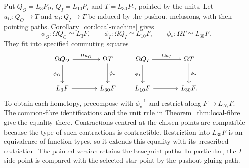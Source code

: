 Put $Q_O=L_3P_O$, $Q_I=L_{10}P_I$ and $T=L_{30}P_*$, pointed by the units. Let $u_O:Q_O\to T$ and $u_I:Q_I\to T$ be induced by the pushout inclusions, with their pointing paths. Corollary~\ref{cor:local-machine} gives
\[
\phi_O:\Omega Q_O\simeq L_3F,\qquad
\phi_I:\Omega Q_I\simeq L_{10}F,\qquad
\phi_*:\Omega T\simeq L_{30}F.
\]
They fit into specified commuting squares
\begin{equation}\label{eq:loop-comparisons}
\begin{tikzcd}[column sep=large,row sep=large]
\Omega Q_O \arrow[r,"\Omega u_O"] \arrow[d,"\phi_O"'] & \Omega T \arrow[d,"\phi_*"] \\
L_3F \arrow[r] & L_{30}F
\end{tikzcd}
\qquad
\begin{tikzcd}[column sep=large,row sep=large]
\Omega Q_I \arrow[r,"\Omega u_I"] \arrow[d,"\phi_I"'] & \Omega T \arrow[d,"\phi_*"] \\
L_{10}F \arrow[r] & L_{30}F.
\end{tikzcd}
\end{equation}
To obtain each homotopy, precompose with $\phi_c^{-1}$ and restrict along $F\to L_{N_c}F$. The common-fibre identifications and the unit rule in Theorem~\ref{thm:local-fibre} give the equality there. Contractions centred at the chosen points are compatible because the type of such contractions is contractible. Restriction into $L_{30}F$ is an equivalence of function types, so it extends this equality with its prescribed restriction. The pointed version retains the basepoint paths. In particular, the $I$-side point is compared with the selected star point by the pushout gluing path.

